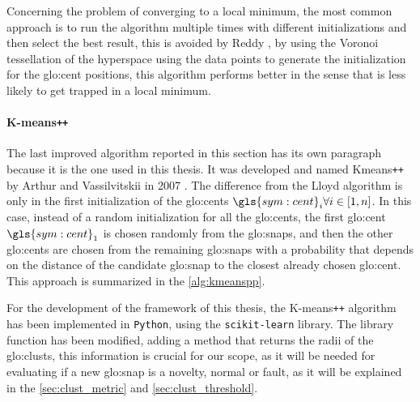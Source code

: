 Concerning the problem of converging to a local minimum, the most common approach is to run the algorithm multiple times with different initializations and then select the best result, this is avoided by Reddy \cite{Vornoi_Kmeans}, by using the Voronoi tessellation of the hyperspace using the data points to generate the initialization for the {\gls{glo:cent}} positions, this algorithm performs better in the sense that is less likely to get trapped in a local minimum.


\paragraph{K-means\texttt{++}} 
The last improved algorithm reported in this section has its own paragraph because it is the one used in this thesis. It was developed and named Kmeans\texttt{++} by Arthur and Vassilvitskii in 2007 \cite{Kmeanspp}. The difference from the Lloyd algorithm is only in the first initialization of the {\gls{glo:cent}}s $\gls{sym:cent}_i \forall i \in [1,n]$. In this case, instead of a random initialization for all the {\gls{glo:cent}}s, the first {\gls{glo:cent}} $\gls{sym:cent}_1$ is chosen randomly from the {\gls{glo:snap}}s, and then the other {\gls{glo:cent}}s are chosen from the remaining {\gls{glo:snap}}s with a probability that depends on the distance of the candidate {\gls{glo:snap}} to the closest already chosen {\gls{glo:cent}}. This approach is summarized in the \autoref{alg:kmeanspp}.

For the development of the framework of this thesis, the K-means\texttt{++} algorithm has been implemented in \texttt{Python}, using the \texttt{scikit-learn} library. The library function has been modified, adding a method that returns the radii of the \gls{glo:clust}s, this information is crucial for our scope, as it will be needed for evaluating if a new {\gls{glo:snap}} is a novelty, normal or fault, as it will be explained in the \autoref{sec:clust_metric} and \autoref{sec:clust_threshold}.

